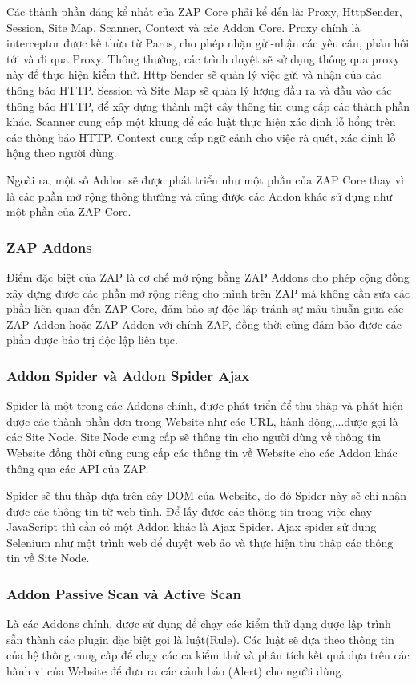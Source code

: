 \documentclass[./../main.tex]{subfiles}
\begin{document}
Các thành phần đáng kể nhất của ZAP Core phải kể đến là: Proxy, HttpSender, Session,
Site Map, Scanner, Context và các Addon Core. Proxy chính là interceptor được kế thừa
từ Paros, cho phép nhặn gửi-nhận các yêu cầu, phản hồi tới và đi qua Proxy. Thông
thường, các trình duyệt sẽ sử dụng thông qua proxy này để thực hiện kiểm thử. Http
Sender sẽ quản lý việc gửi và nhận của các thông báo HTTP. Session và Site Map sẽ quản lý
lượng đầu ra và đầu vào các thông báo HTTP, để xây dựng thành một cây thông tin cung
cấp các thành phần khác. Scanner cung cấp một khung để các luật thực hiện xác định
lỗ hổng trên các thông báo HTTP. Context cung cấp ngữ cảnh cho việc rà quét, xác định
lỗ hộng theo người dùng.

Ngoài ra, một số Addon sẽ được phát triển như một phần của ZAP Core thay vì
là các phần mở rộng thông thường và cũng được các Addon khác sử dụng như
một phần của ZAP Core.

\subsubsection{ZAP Addons}
Điểm đặc biệt của ZAP là cơ chế mở rộng bằng ZAP Addons cho phép cộng đồng
xây dựng được các phần mở rộng riêng cho mình trên ZAP mà không cần sửa
các phần liên quan đến ZAP Core, đảm bảo sự độc lập tránh sự mâu thuẫn giữa
các ZAP Addon hoặc ZAP Addon với chính ZAP, đồng thời cũng đảm bảo được các
phần được bảo trị độc lập liên tục.

\subsubsection{Addon Spider và Addon Spider Ajax}
Spider là một trong các Addons chính, được phát triển để thu thập và phát
hiện được các thành phần đơn trong Website như các URL, hành động,...được gọi là các
Site Node. Site Node cung cấp sẽ thông tin cho người dùng về thông tin
Website đồng thời cũng cung cấp các thông tin về Website cho các Addon
khác thông qua các API của ZAP.

Spider sẽ thu thập dựa trên cây DOM của Website, do đó Spider này sẽ chỉ nhận
được các thông tin từ web tĩnh. Để lấy được các thông tin trong việc chạy
JavaScript thì cần có một Addon khác là Ajax Spider. Ajax spider sử dụng
Selenium như một trình web để duyệt web ảo và thực hiện thu thập các thông
tin về Site Node.
\subsubsection{Addon Passive Scan và Active Scan}
Là các Addons chính, được sử dụng để chạy các kiểm thử dạng được lập trình
sẵn thành các plugin đặc biệt gọi là luật(Rule). Các luật sẽ dựa theo thông
tin của hệ thống cung cấp để chạy các ca kiểm thử và phân tích kết quả dựa
trên các hành vi của Website để đưa ra các cảnh báo (Alert) cho người dùng.
\end{document}
